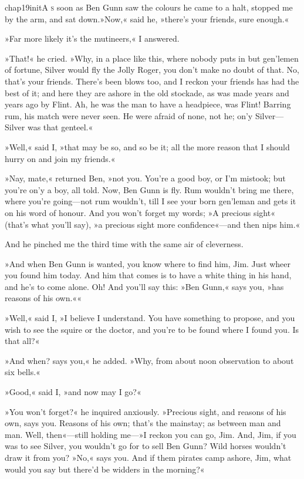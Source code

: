 
   \lettrine[lines=4,image=true]{chap19initA}{ s} soon as Ben Gunn saw the colours he came to a halt, stopped me by the arm, and sat down.»Now,« said he, »there's your friends, sure enough.« 

\zz
»Far more likely it's the mutineers,« I answered.
   
»That!« he cried. »Why, in a place like this, where nobody puts in but gen'lemen of fortune, Silver would fly the Jolly Roger, you don't make no doubt of that. No, that's your friends. There's been blows too, and I reckon your friends has had the best of it; and here they are ashore in the old stockade, as was made years and years ago by Flint. Ah, he was the man to have a headpiece, was Flint! Barring rum, his match were never seen. He were afraid of none, not he; on'y Silver—Silver was that genteel.«

»Well,« said I, »that may be so, and so be it; all the more reason that I should hurry on and join my friends.«

»Nay, mate,« returned Ben, »not you. You're a good boy, or I'm mistook; but you're on'y a boy, all told. Now, Ben Gunn is fly. Rum wouldn't bring me there, where you're going—not rum wouldn't, till I see your born gen'leman and gets it on his word of honour. And you won't forget my words; »A precious sight« (that's what you'll say), »a precious sight more confidence«—and then nips him.«

And he pinched me the third time with the same air of cleverness.

»And when Ben Gunn is wanted, you know where to find him, Jim. Just wheer you found him today. And him that comes is to have a white thing in his hand, and he's to come alone. Oh! And you'll say this: »Ben Gunn,« says you, »has reasons of his own.««

»Well,« said I, »I believe I understand. You have something to propose, and you wish to see the squire or the doctor, and you're to be found where I found you. Is that all?«

»And when? says you,« he added. »Why, from about noon observation to about six bells.«

»Good,« said I, »and now may I go?«

»You won't forget?« he inquired anxiously. »Precious sight, and reasons of his own, says you. Reasons of his own; that's the mainstay; as between man and man. Well, then«—still holding me—»I reckon you can go, Jim. And, Jim, if you was to see Silver, you wouldn't go for to sell Ben Gunn? Wild horses wouldn't draw it from you? »No,« says you. And if them pirates camp ashore, Jim, what would you say but there'd be widders in the morning?«

